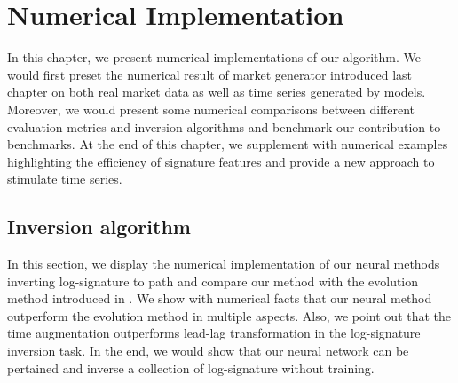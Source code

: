 \documentclass[12pt]{report}
\theoremstyle{definition}
\theoremstyle{remark}
\begin{document}
\chapter{Numerical Implementation}
In this chapter, we present numerical implementations of our algorithm. We would first preset the numerical result of market generator introduced last chapter on both real market data as well as time series generated by models. Moreover, we would present some numerical comparisons between different evaluation metrics and inversion algorithms and benchmark our contribution to benchmarks. At the end of this chapter, we supplement with numerical examples highlighting the efficiency of signature features and provide a new approach to stimulate time series. 


\section{Inversion algorithm}
In this section, we display the numerical implementation of our neural methods inverting log-signature to path and compare our method with the evolution method introduced in \cite{buehler2020data}. We show with numerical facts that our neural method outperform the evolution method in multiple aspects. Also, we point out that the time augmentation outperforms lead-lag transformation in the log-signature inversion task. In the end, we would show that our neural network can be pertained and inverse a collection of log-signature without training.
\end{document}
